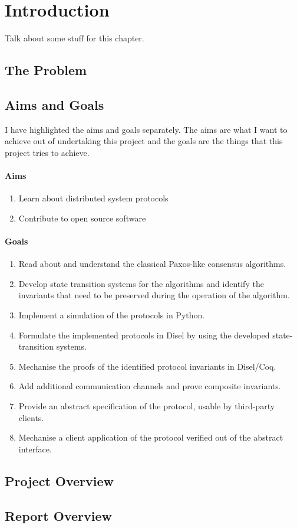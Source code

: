 \chapter{Introduction}
Talk about some stuff for this chapter.

\newpage


\section{The Problem}

\section{Aims and Goals}
I have highlighted the aims and goals separately. The aims are what I want to
achieve out of undertaking this project and the goals are the things that this
project tries to achieve.

\subsubsection{Aims}
\begin{enumerate}
  \item Learn about distributed system protocols
  \item Contribute to open source software
\end{enumerate}

\subsubsection{Goals}
\begin{enumerate}
  \item Read about and understand the classical Paxos-like consensus algorithms.
  \item Develop state transition systems for the algorithms and identify the invariants that need to be preserved during the operation of the algorithm.
  \item Implement a simulation of the protocols in Python.
  \item Formulate the implemented protocols in Disel by using the developed state-transition systems.
  \item Mechanise the proofs of the identified protocol invariants in Disel/Coq.
  \item Add additional communication channels and prove composite invariants.
  \item Provide an abstract specification of the protocol, usable by third-party clients.
  \item Mechanise a client application of the protocol verified out of the abstract interface.
\end{enumerate}


\section{Project Overview}

\section{Report Overview}
